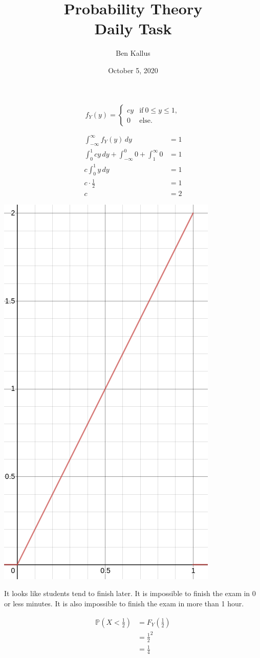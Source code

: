 \documentclass[12pt]{article}
\title{Probability Theory \\ Daily Task}
\author{Ben Kallus}
\date{October 5, 2020}
\begin{document}
\maketitle

$$f_Y(y) = \begin{cases} cy & \text{if}~0 \leq y \leq 1, \\
                         0 & \text{else.} \end{cases}$$

\begin{align*}
    \int_{-\infty}^\infty f_Y(y)\,dy &= 1 \\
    \int_0^1 cy\,dy + \int_{-\infty}^0 0 + \int_1^{\infty} 0 &= 1 \\
    c \int_0^1 y\,dy &= 1 \\
    c \cdot \frac12 &= 1 \\
    c &= 2
\end{align*}

\newpage
{}

\begin{center}{\includegraphics[width=.4\textwidth]{capture.png}}\end{center}

It looks like students tend to finish later. It is impossible to finish the exam in 0 or less minutes. It is also impossible to finish the exam in more than 1 hour.

\medskip
{}
\begin{align*}
    \mathbb P(X < {\frac12}) &= F_Y({\frac12}) \\
                       &= {\frac12}^2 \\
                       &= {\frac14}
\end{align*}
\end{document}
